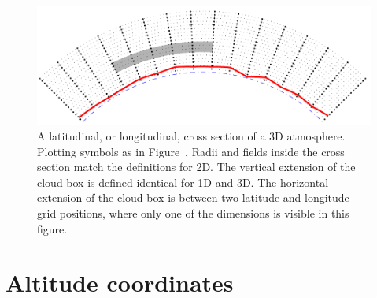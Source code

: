 \begin{figure}[!p]
 \begin{center}
  \includegraphics*[width=0.98\hsize]{atm_dim_3dcross}
  \caption{A latitudinal, or longitudinal, cross section of a 3D atmosphere. 
    Plotting symbols as in Figure~. Radii and
    fields inside the cross section match the definitions for 2D.
    The vertical extension
    of the cloud box is defined identical for 1D and 3D. The horizontal 
    extension of the cloud box is between two latitude and longitude grid
    positions, where only one of the dimensions is visible in this figure.}
 \end{center}
\end{figure}



\section{Altitude coordinates}

